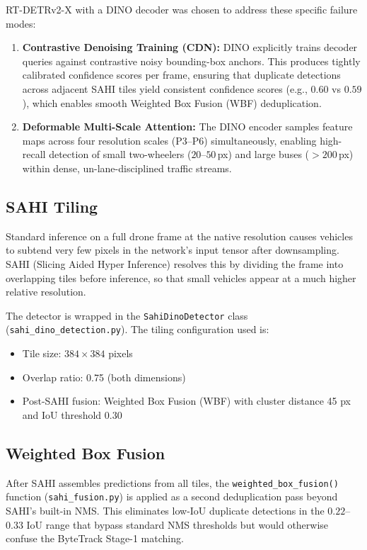\documentclass[12pt,a4paper]{report}
\begin{document}
RT-DETRv2-X with a DINO decoder was chosen to address these specific failure modes:
\begin{enumerate}
    \item \textbf{Contrastive Denoising Training (CDN):} DINO explicitly trains decoder queries against contrastive noisy bounding-box anchors. This produces tightly calibrated confidence scores per frame, ensuring that duplicate detections across adjacent SAHI tiles yield consistent confidence scores (e.g., $0.60$ vs $0.59$), which enables smooth Weighted Box Fusion (WBF) deduplication.
    \item \textbf{Deformable Multi-Scale Attention:} The DINO encoder samples feature maps across four resolution scales (P3--P6) simultaneously, enabling high-recall detection of small two-wheelers ($20$--$50$\,px) and large buses ($>200$\,px) within dense, un-lane-disciplined traffic streams.
\end{enumerate}

\subsection{SAHI Tiling}

Standard inference on a full drone frame at the native resolution causes vehicles to
subtend very few pixels in the network's input tensor after downsampling.  SAHI (Slicing
Aided Hyper Inference) resolves this by dividing the frame into overlapping tiles before
inference, so that small vehicles appear at a much higher relative resolution.

The detector is wrapped in the \texttt{SahiDinoDetector} class
(\texttt{sahi\_dino\_detection.py}).  The tiling configuration used is:
\begin{itemize}
    \item Tile size: $384 \times 384$ pixels
    \item Overlap ratio: 0.75 (both dimensions)
    \item Post-SAHI fusion: Weighted Box Fusion (WBF) with cluster distance 45 px and
          IoU threshold 0.30
\end{itemize}

\subsection{Weighted Box Fusion}

After SAHI assembles predictions from all tiles, the \texttt{weighted\_box\_fusion()}
function (\texttt{sahi\_fusion.py}) is applied as a second deduplication pass beyond
SAHI's built-in NMS.  This eliminates low-IoU duplicate detections in the
$0.22$--$0.33$ IoU range that bypass standard NMS thresholds but would otherwise confuse
the ByteTrack Stage-1 matching.
\end{document}

